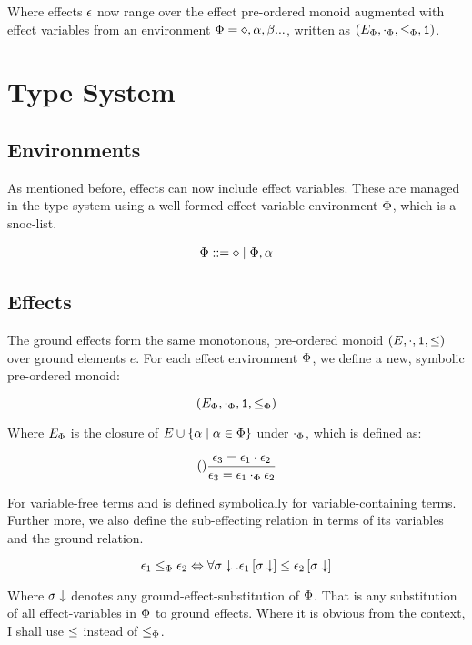 \documentclass{Report}
\begin{document}
Where effects $\e$ now range over the effect pre-ordered monoid augmented with effect variables from an environment $\P = \nil, \a, \b ...$, written as $(E_\P, \dotp, \subeffectp, \1)$.

\section{Type System}
\subsection{Environments}
As mentioned before, effects can now include effect variables. These are managed in the type system using a well-formed effect-variable-environment $\P$, which is a snoc-list.

\begin{align}
    \P ::= \nil \mid \P, \a
\end{align}



\subsection{Effects}
The ground effects form the same monotonous, pre-ordered monoid $(E, \dot, \1, \subeffect)$ over ground elements $e$. For each effect environment $\P$, we define a new, symbolic pre-ordered monoid:

\begin{equation}
    (E_\P, \dotp, \1, \subeffectp)
\end{equation}

Where $E_\P$ is the closure of $E\cup \left\{\a\mid\a\in\P\right\}$ under $\dotp$, which is defined as:

\begin{equation}
    \treerule{}{\e_3 = \e_1\dot\e_2}{\e_3 = \e_1\dotp\e_2}
\end{equation} 

For variable-free terms and is defined symbolically for variable-containing terms. Further more, we also define the sub-effecting relation in terms of its variables and the ground relation.

\begin{equation}
    \e_1 \subeffectp \e_2 \Leftrightarrow \forall \si\downarrow. \e_1\sub{\si\downarrow} \subeffect \e_2\sub{\si\downarrow}
\end{equation}

Where $\si\downarrow$ denotes any ground-effect-substitution of $\P$. That is any substitution of all effect-variables in $\P$ to ground effects. Where it is obvious from the context, I shall use $\subeffect$ instead of $\subeffectp$.
\end{document}
